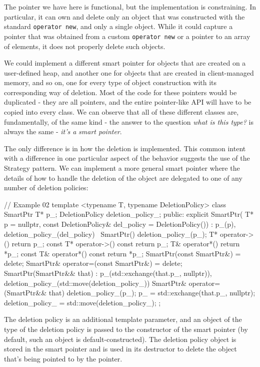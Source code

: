 The pointer we have here is functional, but the implementation is constraining. In particular, it can own and delete only an object that was constructed with the standard \texttt{operator\ new}, and only a single object. While it could capture a pointer that was obtained from a custom \texttt{operator\ new} or a pointer to an array of elements, it does not properly delete such objects.

We could implement a different smart pointer for objects that are created on a user-defined heap, and another one for objects that are created in client-managed memory, and so on, one for every type of object construction with its corresponding way of deletion. Most of the code for these pointers would be duplicated - they are all pointers, and the entire pointer-like API will have to be copied into every class. We can observe that all of these different classes are, fundamentally, of the same kind - the answer to the question \emph{what is this type?} is always the same - \emph{it's a} \emph{smart pointer}.

The only difference is in how the deletion is implemented. This common intent with a difference in one particular aspect of the behavior suggests the use of the Strategy pattern. We can implement a more general smart pointer where the details of how to handle the deletion of the object are delegated to one of any number of deletion policies:

\begin{code}
// Example 02
template <typename T, typename DeletionPolicy>
class SmartPtr {
  T* p_;
  DeletionPolicy deletion_policy_;
  public:
  explicit SmartPtr(
    T* p = nullptr,
    const DeletionPolicy& del_policy = DeletionPolicy()) :
    p_(p), deletion_policy_(del_policy)
  {}
  ~SmartPtr() {
    deletion_policy_(p_);
  }
  T* operator->() { return p_; }
  const T* operator->() const { return p_; }
  T& operator*() { return *p_; }
  const T& operator*() const { return *p_; }
  SmartPtr(const SmartPtr&) = delete;
  SmartPtr& operator=(const SmartPtr&) = delete;
  SmartPtr(SmartPtr&& that) :
    p_(std::exchange(that.p_, nullptr)),
    deletion_policy_(std::move(deletion_policy_))
 {}
  SmartPtr& operator=(SmartPtr&& that) {
    deletion_policy_(p_);
    p_ = std::exchange(that.p_, nullptr);
    deletion_policy_ = std::move(deletion_policy_);
  }
};
\end{code}

The deletion policy is an additional template parameter, and an object of the type of the deletion policy is passed to the constructor of the smart pointer (by default, such an object is default-constructed). The deletion policy object is stored in the smart pointer and is used in its destructor to delete the object that's being pointed to by the pointer.

